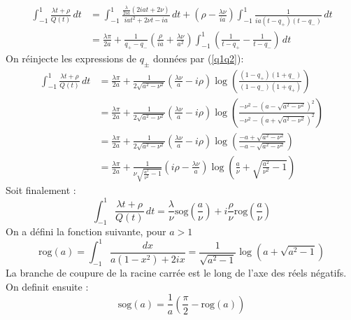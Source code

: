 \begin{equation*}
\begin{split}
\int_{-1}^1 \frac{\lambda t+ \rho}{Q(t)}\, dt&=\int_{-1}^1 \frac{\frac{\lambda}{2ia} (2iat+2\nu)}{iat^2+2\nu t-ia}\,dt+(\rho-\frac{\lambda \nu}{ia})\int_{-1}^1\frac{1}{ia(t-q_+)(t-q_-)}\,dt\\
&=\frac{\lambda\pi}{2a}+\frac{1}{q_+-q_-}\left(\frac{\rho}{ia}+\frac{\lambda\nu}{a^2}\right)\int_{-1}^1\left(\frac{1}{t-q_+}-\frac{1}{t-q_-}\right)\,dt
\end{split}
\end{equation*}
On réinjecte les expressions de $q_\pm$ données par (\ref{q1q2}):
\begin{equation*}
\begin{split}
\int_{-1}^1 \frac{\lambda t+ \rho}{Q(t)}\, dt&=\frac{\lambda\pi}{2a}+\frac{1}{2\sqrt{a^2-\nu^2}}\left(\frac{\lambda\nu}{a}-i\rho\right)\log\left(\frac{(1-q_+)(1+q_-)}{(1-q_-)(1+q_+)}\right)\\
&=\frac{\lambda\pi}{2a}+\frac{1}{2\sqrt{a^2-\nu^2}}\left(\frac{\lambda\nu}{a}-i\rho\right)\log\left(\frac{-\nu^2-(a-\sqrt{a^2-\nu^2})^2}{-\nu^2-(a+\sqrt{a^2-\nu^2})^2}\right)\\
&=\frac{\lambda\pi}{2a}+\frac{1}{2\sqrt{a^2-\nu^2}}\left(\frac{\lambda\nu}{a}-i\rho\right)\log\left(\frac{-a+\sqrt{a^2-\nu^2}}{-a-\sqrt{a^2-\nu^2}}\right)\\
&=\frac{\lambda\pi}{2a}+\frac{1}{\nu\sqrt{\frac{a^2}{\nu^2}-1}}\left(i\rho-\frac{\lambda\nu}{a}\right)\log\left(\frac{a}{\nu}+\sqrt{\frac{a^2}{\nu^2}-1}\right)
\end{split}
\end{equation*}
Soit finalement :
\begin{equation}
\int_{-1}^1 \frac{\lambda t+ \rho}{Q(t)}\, dt=\frac{\lambda}{\nu}\mbox{sog}(\frac{a}{\nu})+i\frac{\rho}{\nu}\mbox{rog}(\frac{a}{\nu})
\label{intQ}
\end{equation}
On a défini la fonction suivante, pour $a>1$
\begin{equation}
\mbox{rog}(a)=\int_{-1}^1\frac{dx}{a(1-x^2)+2ix}=\frac{1}{\sqrt{a^2-1}}\log(a+\sqrt{a^2-1})
\label{defrog}
\end{equation}
La branche de coupure de la racine carrée est le long de l'axe des réels négatifs. On definit ensuite :
\begin{equation}
\mbox{sog}(a)=\frac{1}{a}\left(\frac{\pi}{2}-\mbox{rog}(a)\right)
\label{defsog}
\end{equation}
